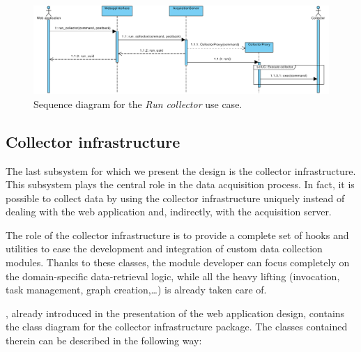\begin{figure}
  \begin{adjustwidth}{-7.4mm}{-1.5cm}
    \includegraphics[width=\linewidth]{images/diagrams/seq-run-collector}
  \end{adjustwidth}
  \caption{Sequence diagram for the \emph{Run collector} use case.}
  \label{fig:seq-run-collector}
\end{figure}


\subsection{Collector infrastructure}

The last subsystem for which we present the design is the collector infrastructure. This subsystem plays the central role in the data acquisition process. In fact, it is possible to collect data by using the collector infrastructure uniquely instead of dealing with the web application and, indirectly, with the acquisition server.

The role of the collector infrastructure is to provide a complete set of hooks and utilities to ease the development and integration of custom data collection modules. Thanks to these classes, the module developer can focus completely on the domain-specific data-retrieval logic, while all the heavy lifting (invocation, task management, graph creation,\ldots) is already taken care of.

, already introduced in the presentation of the web application design, contains the class diagram for the collector infrastructure package. The classes contained therein can be described in the following way:

